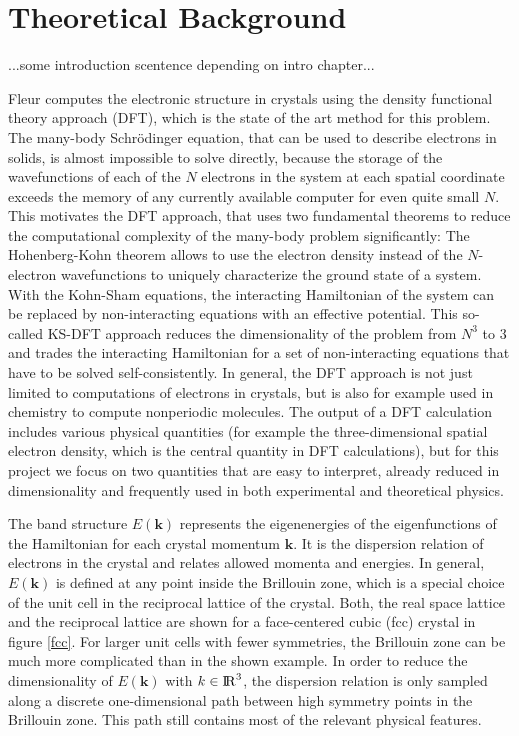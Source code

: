 
\chapter{Theoretical Background}
\label{chap:theory}

...some introduction scentence depending on intro chapter...


Fleur computes the electronic structure in crystals using the density functional theory approach (DFT), which is the state of the art method for this problem. The many-body Schrödinger equation, that can be used to describe electrons in solids, is almost impossible to solve directly, because the storage of the wavefunctions of each of the $N$ electrons in the system at each spatial coordinate exceeds the memory of any currently available computer for even quite small $N$. This motivates the DFT approach, that uses two fundamental theorems to reduce the computational complexity of the many-body problem significantly: The Hohenberg-Kohn theorem allows to use the electron density instead of the $N$-electron wavefunctions to uniquely characterize the ground state of a system. With the Kohn-Sham equations, the interacting Hamiltonian of the system can be replaced by non-interacting equations with an effective potential. This so-called KS-DFT approach reduces the dimensionality of the problem from $N^3$ to $3$ and trades the interacting Hamiltonian for a set of non-interacting equations that have to be solved self-consistently. In general, the DFT approach is not just limited to computations of electrons in crystals, but is also for example used in chemistry to compute nonperiodic molecules.
% 
The output of a DFT calculation includes various physical quantities (for example the three-dimensional spatial electron density, which is the central quantity in DFT calculations), but for this project we focus on two quantities that are easy to interpret, already reduced in dimensionality and frequently used in both experimental and theoretical physics.

The band structure $E(\mathbf{k})$ represents the eigenenergies of the eigenfunctions of the Hamiltonian for each crystal momentum $\mathbf{k}$. It is the dispersion relation of electrons in the crystal and relates allowed momenta and energies. In general, $E(\mathbf{k})$ is defined at any point inside the Brillouin zone, which is a special choice of the unit cell in the reciprocal lattice of the crystal. Both, the real space lattice and the reciprocal lattice are shown for a face-centered cubic (fcc) crystal in figure \ref{fcc}. For larger unit cells with fewer symmetries, the Brillouin zone can be much more complicated than in the shown example. In order to reduce the dimensionality of $E(\mathbf{k})$ with $k \in {\rm I\!R}^3$, the dispersion relation is only sampled along a discrete one-dimensional path between high symmetry points in the Brillouin zone. This path still contains most of the relevant physical features.

